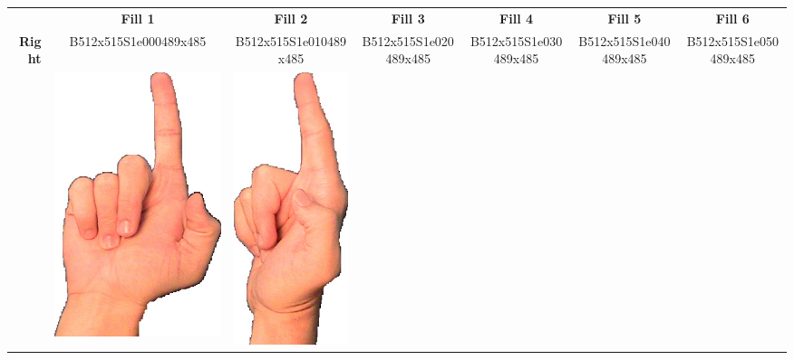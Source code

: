 \documentclass{article}
\begin{document}
\begin{center}
\begin{tabular}{r*{6}{c}}
&\textbf{Fill 1}&\textbf{Fill 2}&\textbf{Fill 3}&\textbf{Fill 4}&\textbf{Fill 5}&\textbf{Fill 6}\\
\multirow{2}{*}{\textbf{Right}}&
B512x515S1e000489x485&
B512x515S1e010489x485&
B512x515S1e020489x485&
B512x515S1e030489x485&
B512x515S1e040489x485&
B512x515S1e050489x485\\
&
\includegraphics[scale=0.1]{images/09-04-1.jpg}&
\includegraphics[scale=0.1]{images/09-04-2.jpg}&

\end{tabular}
\end{center}
\end{document}
